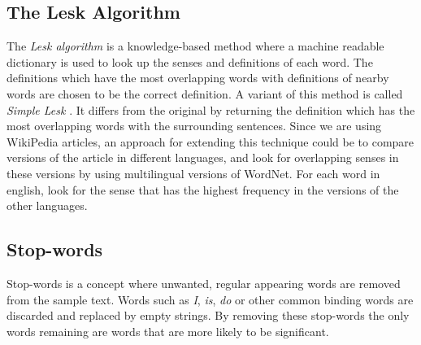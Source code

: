 \subsection{The Lesk Algorithm}

The \emph{Lesk algorithm} is a knowledge-based method where a machine readable dictionary is used to look up the senses and definitions of each word. The definitions which have the most overlapping words with definitions of nearby words are chosen to be the correct definition. \parencite{lesk1986automatic} A variant of this method is called \emph{Simple Lesk} \parencite{kilgarriff2000english}. It differs from the original by returning the definition which has the most overlapping words with the surrounding sentences. 
Since we are using WikiPedia articles, an approach for extending this technique could be to compare versions of the article in different languages, and look for overlapping senses in these versions by using multilingual versions of WordNet. For each word in english, look for the sense that has the highest frequency in the versions of the other languages.

\subsection{Stop-words}
Stop-words is a concept where unwanted, regular appearing words are removed from the sample text. Words such as \emph{I}, \emph{is}, \emph{do} or other common binding words are discarded and replaced by empty strings. By removing these stop-words the only words remaining are words that are more likely to be significant. 